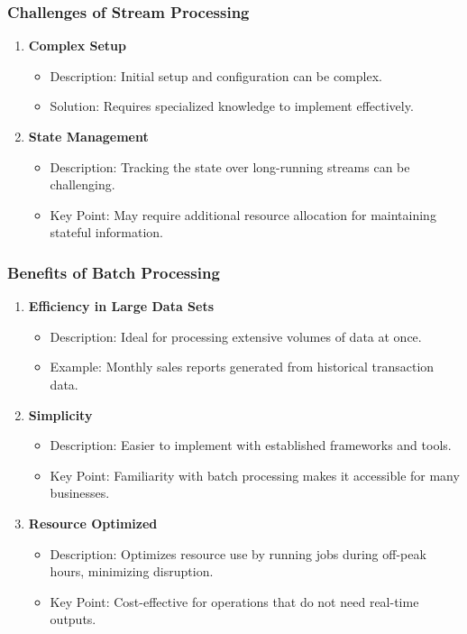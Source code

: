 \documentclass{beamer}
\begin{document}
\begin{frame}[fragile]
    \frametitle{Challenges of Stream Processing}
    \begin{enumerate}
        \item \textbf{Complex Setup}
        \begin{itemize}
            \item Description: Initial setup and configuration can be complex.
            \item Solution: Requires specialized knowledge to implement effectively.
        \end{itemize}
        \item \textbf{State Management}
        \begin{itemize}
            \item Description: Tracking the state over long-running streams can be challenging.
            \item Key Point: May require additional resource allocation for maintaining stateful information.
        \end{itemize}
    \end{enumerate}
\end{frame}

\begin{frame}[fragile]
    \frametitle{Benefits of Batch Processing}
    \begin{enumerate}
        \item \textbf{Efficiency in Large Data Sets}
        \begin{itemize}
            \item Description: Ideal for processing extensive volumes of data at once.
            \item Example: Monthly sales reports generated from historical transaction data.
        \end{itemize}
        \item \textbf{Simplicity}
        \begin{itemize}
            \item Description: Easier to implement with established frameworks and tools.
            \item Key Point: Familiarity with batch processing makes it accessible for many businesses.
        \end{itemize}
        \item \textbf{Resource Optimized}
        \begin{itemize}
            \item Description: Optimizes resource use by running jobs during off-peak hours, minimizing disruption.
            \item Key Point: Cost-effective for operations that do not need real-time outputs.
        \end{itemize}
    \end{enumerate}
\end{frame}
\end{document}

